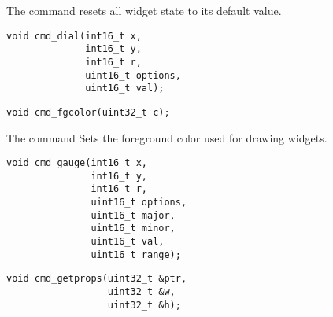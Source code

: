 The  command
resets all widget state to its default value.



\begin{framed}
\begin{verbatim}
void cmd_dial(int16_t x,
              int16_t y,
              int16_t r,
              uint16_t options,
              uint16_t val);
\end{verbatim}
\end{framed}



\begin{framed}
\begin{verbatim}
void cmd_fgcolor(uint32_t c);
\end{verbatim}
\end{framed}

The  command
Sets the foreground color used for drawing widgets.
\style


\begin{framed}
\begin{verbatim}
void cmd_gauge(int16_t x,
               int16_t y,
               int16_t r,
               uint16_t options,
               uint16_t major,
               uint16_t minor,
               uint16_t val,
               uint16_t range);
\end{verbatim}
\end{framed}




\begin{framed}
\begin{verbatim}
void cmd_getprops(uint32_t &ptr,
                  uint32_t &w,
                  uint32_t &h);
\end{verbatim}
\end{framed}

